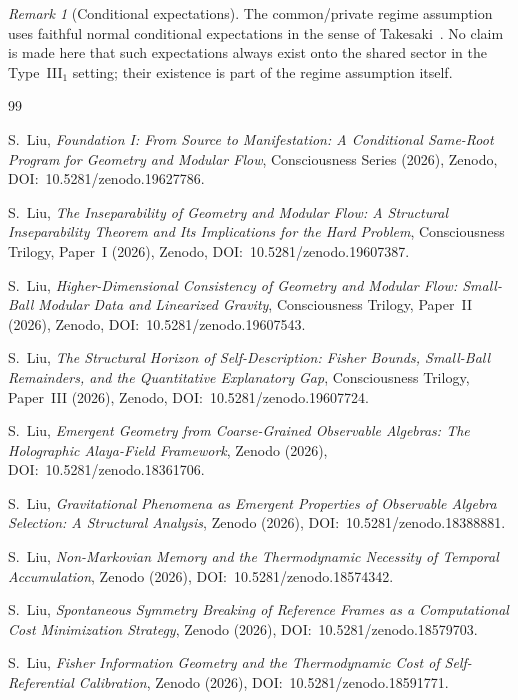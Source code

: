 \documentclass[12pt]{article}
\theoremstyle{definition}
\theoremstyle{remark}
\newtheorem{remark}[theorem]{Remark}
\begin{document}
\begin{remark}[Conditional expectations]
The common/private regime assumption uses faithful normal conditional
expectations in the sense of Takesaki~\cite{Takesaki1972}. No claim is
made here that such expectations always exist onto the shared sector in
the Type~III\(_1\) setting; their existence is part of the regime
assumption itself.
\end{remark}
\newpage
{}

\begin{thebibliography}{99}
\sloppy

S.~Liu,
\emph{Foundation I: From Source to Manifestation: A Conditional Same-Root Program for Geometry and Modular Flow},
Consciousness Series (2026),
Zenodo, DOI:~10.5281/zenodo.19627786.

S.~Liu,
\emph{The Inseparability of Geometry and Modular Flow: A Structural Inseparability Theorem and Its Implications for the Hard Problem},
Consciousness Trilogy, Paper~I (2026),
Zenodo, DOI:~10.5281/zenodo.19607387.

S.~Liu,
\emph{Higher-Dimensional Consistency of Geometry and Modular Flow: Small-Ball Modular Data and Linearized Gravity},
Consciousness Trilogy, Paper~II (2026),
Zenodo, DOI:~10.5281/zenodo.19607543.

S.~Liu,
\emph{The Structural Horizon of Self-Description: Fisher Bounds, Small-Ball Remainders, and the Quantitative Explanatory Gap},
Consciousness Trilogy, Paper~III (2026),
Zenodo, DOI:~10.5281/zenodo.19607724.

S.~Liu,
\emph{Emergent Geometry from Coarse-Grained Observable Algebras: The Holographic Alaya-Field Framework},
Zenodo (2026), DOI:~10.5281/zenodo.18361706.

S.~Liu,
\emph{Gravitational Phenomena as Emergent Properties of Observable Algebra Selection: A Structural Analysis},
Zenodo (2026), DOI:~10.5281/zenodo.18388881.

S.~Liu,
\emph{Non-Markovian Memory and the Thermodynamic Necessity of Temporal Accumulation},
Zenodo (2026), DOI:~10.5281/zenodo.18574342.

S.~Liu,
\emph{Spontaneous Symmetry Breaking of Reference Frames as a Computational Cost Minimization Strategy},
Zenodo (2026), DOI:~10.5281/zenodo.18579703.

S.~Liu,
\emph{Fisher Information Geometry and the Thermodynamic Cost of Self-Referential Calibration},
Zenodo (2026), DOI:~10.5281/zenodo.18591771.


\end{thebibliography}
\end{document}

